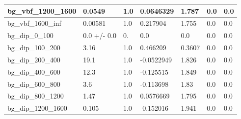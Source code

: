 \documentclass[a4paper, 10pt]{article}
\begin{document}
\begin{table}[H]
\begin{center}
\begin{tabular}{|m{23.0mm}|m{23.0mm}|m{18.0mm}|m{19.0mm}|m{19.0mm}|m{19.0mm}|m{19.0mm}|}
      \hline
      {\cellcolor{white}         bg\_vbf\_1200\_1600}& {\cellcolor{white}         0.0549}& {\cellcolor{white}         1.0}& {\cellcolor{white}         0.0646329}& {\cellcolor{white}         1.787}& {\cellcolor{green}         0.0}& {\cellcolor{green}         0.0}\\
      \hline
      {\cellcolor{white}         bg\_vbf\_1600\_inf}& {\cellcolor{white}         0.00581}& {\cellcolor{white}         1.0}& {\cellcolor{white}         0.217904}& {\cellcolor{white}         1.755}& {\cellcolor{green}         0.0}& {\cellcolor{green}         0.0}\\
      \hline
      {\cellcolor{white}         bg\_dip\_0\_100}& {\cellcolor{white}         0.0 +/\-- 0.0}& {\cellcolor{white}         0.}& {\cellcolor{white}         0.0}& {\cellcolor{white}         0.0}& {\cellcolor{green}         0.0}& {\cellcolor{green}         0.0}\\
      \hline
      {\cellcolor{white}         bg\_dip\_100\_200}& {\cellcolor{white}         3.16}& {\cellcolor{white}         1.0}& {\cellcolor{white}         0.466209}& {\cellcolor{white}         0.3607}& {\cellcolor{green}         0.0}& {\cellcolor{green}         0.0}\\
      \hline
      {\cellcolor{white}         bg\_dip\_200\_400}& {\cellcolor{white}         19.1}& {\cellcolor{white}         1.0}& {\cellcolor{white}         -0.0522949}& {\cellcolor{white}         1.826}& {\cellcolor{green}         0.0}& {\cellcolor{green}         0.0}\\
      \hline
      {\cellcolor{white}         bg\_dip\_400\_600}& {\cellcolor{white}         12.3}& {\cellcolor{white}         1.0}& {\cellcolor{white}         -0.125515}& {\cellcolor{white}         1.849}& {\cellcolor{green}         0.0}& {\cellcolor{green}         0.0}\\
      \hline
      {\cellcolor{white}         bg\_dip\_600\_800}& {\cellcolor{white}         3.6}& {\cellcolor{white}         1.0}& {\cellcolor{white}         -0.113698}& {\cellcolor{white}         1.83}& {\cellcolor{green}         0.0}& {\cellcolor{green}         0.0}\\
      \hline
      {\cellcolor{white}         bg\_dip\_800\_1200}& {\cellcolor{white}         1.47}& {\cellcolor{white}         1.0}& {\cellcolor{white}         0.0576669}& {\cellcolor{white}         1.795}& {\cellcolor{green}         0.0}& {\cellcolor{green}         0.0}\\
      \hline
      {\cellcolor{white}         bg\_dip\_1200\_1600}& {\cellcolor{white}         0.105}& {\cellcolor{white}         1.0}& {\cellcolor{white}         -0.152016}& {\cellcolor{white}         1.941}& {\cellcolor{green}         0.0}& {\cellcolor{green}         0.0}\\

\end{tabular}
\end{center}
\end{table}
\end{document}
